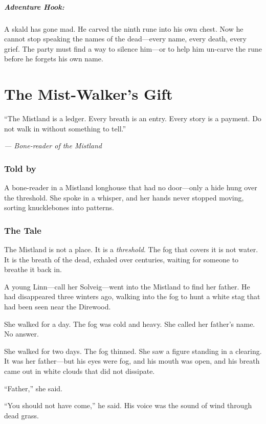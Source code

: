 \documentclass[9pt,a5paper]{extbook}
\begin{document}
\paragraph{Adventure Hook:}
A skald has gone mad. He carved the ninth rune into his own chest. Now he cannot stop speaking the names of the dead---every name, every death, every grief. The party must find a way to silence him---or to help him un-carve the rune before he forgets his own name.

\clearpage

\chapter{The Mist-Walker's Gift}

\epigraph{``The Mistland is a ledger. Every breath is an entry. Every story is a payment. Do not walk in without something to tell.''}{\textit{--- Bone-reader of the Mistland}}

\subsection*{Told by}

A bone-reader in a Mistland longhouse that had no door---only a hide hung over the threshold. She spoke in a whisper, and her hands never stopped moving, sorting knucklebones into patterns.

\subsection*{The Tale}

The Mistland is not a place. It is a \textit{threshold}. The fog that covers it is not water. It is the breath of the dead, exhaled over centuries, waiting for someone to breathe it back in.

A young Linn---call her Solveig---went into the Mistland to find her father. He had disappeared three winters ago, walking into the fog to hunt a white stag that had been seen near the Direwood.

She walked for a day. The fog was cold and heavy. She called her father's name. No answer.

She walked for two days. The fog thinned. She saw a figure standing in a clearing. It was her father---but his eyes were fog, and his mouth was open, and his breath came out in white clouds that did not dissipate.

``Father,'' she said.

``You should not have come,'' he said. His voice was the sound of wind through dead grass.
\end{document}
